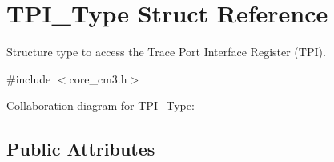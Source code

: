\hypertarget{structTPI__Type}{}\section{T\+P\+I\+\_\+\+Type Struct Reference}
\label{structTPI__Type}


Structure type to access the Trace Port Interface Register (T\+PI).  




{\ttfamily \#include $<$core\+\_\+cm3.\+h$>$}



Collaboration diagram for T\+P\+I\+\_\+\+Type\+:
\subsection*{Public Attributes}
